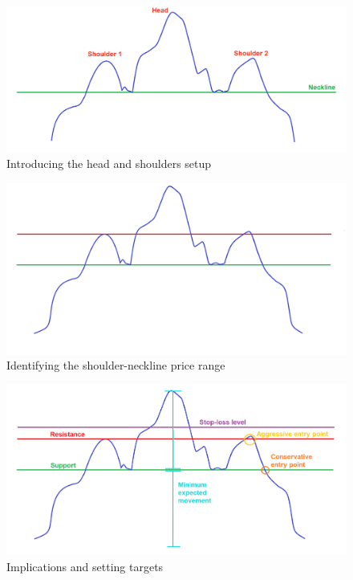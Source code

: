 \documentclass{article}
\begin{document}
\vspace{10pt}

\begin{figure}[!htb]
    \centering
    \includegraphics[width=\textwidth]{imgs/63.png}
    \caption{Introducing the head and shoulders setup}
\end{figure}

\vspace{10pt}

\begin{figure}[!htb]
    \centering
    \includegraphics[width=\textwidth]{imgs/64.png}
    \caption{Identifying the shoulder-neckline price range}
\end{figure}

\vspace{10pt}

\begin{figure}[!htb]
    \centering
    \includegraphics[width=\textwidth]{imgs/65.png}
    \caption{Implications and setting targets}
\end{figure}
\end{document}
